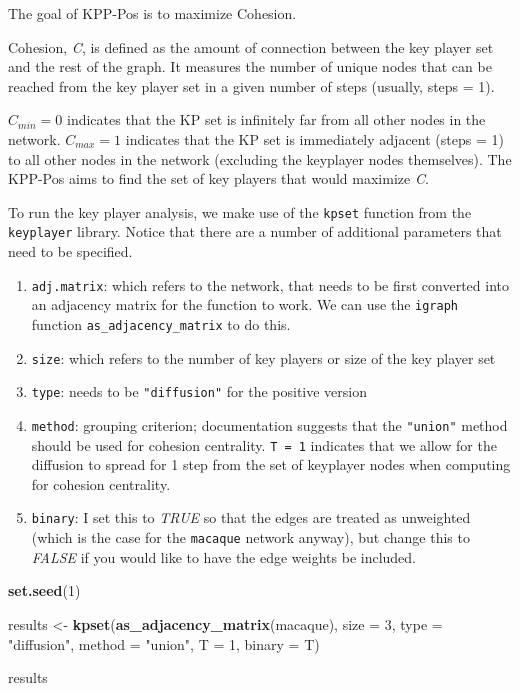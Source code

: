 \documentclass[
]{book}
\newenvironment{Shaded}{\begin{snugshade}}{\end{snugshade}}
\newcommand{\AttributeTok}[1]{\textcolor[rgb]{0.13,0.29,0.53}{#1}}
\newcommand{\DecValTok}[1]{\textcolor[rgb]{0.00,0.00,0.81}{#1}}
\newcommand{\FunctionTok}[1]{\textcolor[rgb]{0.13,0.29,0.53}{\textbf{#1}}}
\newcommand{\NormalTok}[1]{#1}
\newcommand{\OtherTok}[1]{\textcolor[rgb]{0.56,0.35,0.01}{#1}}
\newcommand{\StringTok}[1]{\textcolor[rgb]{0.31,0.60,0.02}{#1}}
\providecommand{\tightlist}{%
  \setlength{\itemsep}{0pt}\setlength{\parskip}{0pt}}
\begin{document}
The goal of KPP-Pos is to maximize Cohesion.

Cohesion, \emph{C}, is defined as the amount of connection between the key player set and the rest of the graph. It measures the number of unique nodes that can be reached from the key player set in a given number of steps (usually, steps = 1).

\(C_{min} = 0\) indicates that the KP set is infinitely far from all other nodes in the network. \(C_{max} = 1\) indicates that the KP set is immediately adjacent (steps = 1) to all other nodes in the network (excluding the keyplayer nodes themselves). The KPP-Pos aims to find the set of key players that would maximize \emph{C}.

To run the key player analysis, we make use of the \texttt{kpset} function from the \texttt{keyplayer} library. Notice that there are a number of additional parameters that need to be specified.

\begin{enumerate}
\def\labelenumi{(\roman{enumi})}
\tightlist
\item
  \texttt{adj.matrix}: which refers to the network, that needs to be first converted into an adjacency matrix for the function to work. We can use the \texttt{igraph} function \texttt{as\_adjacency\_matrix} to do this.
\item
  \texttt{size}: which refers to the number of key players or size of the key player set
\item
  \texttt{type}: needs to be \texttt{"diffusion"} for the positive version
\item
  \texttt{method}: grouping criterion; documentation suggests that the \texttt{"union"} method should be used for cohesion centrality. \texttt{T\ =\ 1} indicates that we allow for the diffusion to spread for 1 step from the set of keyplayer nodes when computing for cohesion centrality.
\item
  \texttt{binary}: I set this to \emph{TRUE} so that the edges are treated as unweighted (which is the case for the \texttt{macaque} network anyway), but change this to \emph{FALSE} if you would like to have the edge weights be included.
\end{enumerate}

\begin{Shaded}
\begin{Highlighting}[]
\FunctionTok{set.seed}\NormalTok{(}\DecValTok{1}\NormalTok{)}

\NormalTok{results }\OtherTok{\textless{}{-}} \FunctionTok{kpset}\NormalTok{(}\FunctionTok{as\_adjacency\_matrix}\NormalTok{(macaque), }
                 \AttributeTok{size =} \DecValTok{3}\NormalTok{, }
                 \AttributeTok{type =} \StringTok{"diffusion"}\NormalTok{, }
                 \AttributeTok{method =} \StringTok{"union"}\NormalTok{, }
                 \AttributeTok{T =} \DecValTok{1}\NormalTok{, }
                 \AttributeTok{binary =}\NormalTok{ T)}

\NormalTok{results }
\end{Highlighting}
\end{Shaded}
\end{document}
